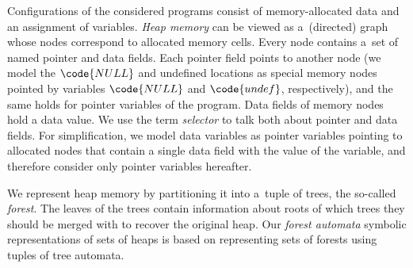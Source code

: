 {Configurations of the considered programs consist of
memory-allocated data and an assignment of variables.
\emph{Heap memory} can be viewed as a~(directed) graph whose nodes correspond
to allocated memory cells.
Every node contains a~set of named pointer and data fields.
Each pointer field points to another node (we model the
$\code{NULL}$ and undefined locations as special memory nodes pointed by variables
$\code{NULL}$ and $\code{undef}$, respectively), and the same holds for pointer variables of the program.
Data fields of memory nodes hold a data value.
We use the term \emph{selector} to talk both about pointer and data fields.
For simplification, we model data variables as pointer variables pointing to
allocated nodes that contain a single data field with the value of the
variable, and therefore consider only pointer
variables hereafter.


We represent heap memory by partitioning it into a~tuple of trees, the
so-called \emph{forest}.
The leaves of the trees contain information about roots of which trees they should be merged with to recover the original heap. 
Our \emph{forest automata} symbolic representations of sets of heaps is based
on representing sets of forests using tuples of tree automata.
%


}
